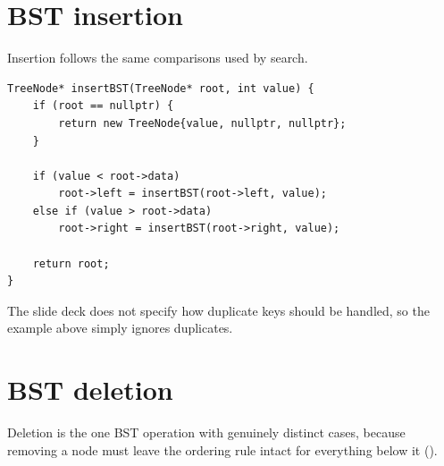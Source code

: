\section{BST insertion}

Insertion follows the same comparisons used by search.

\begin{lstlisting}
TreeNode* insertBST(TreeNode* root, int value) {
    if (root == nullptr) {
        return new TreeNode{value, nullptr, nullptr};
    }

    if (value < root->data)
        root->left = insertBST(root->left, value);
    else if (value > root->data)
        root->right = insertBST(root->right, value);

    return root;
}
\end{lstlisting}

The slide deck does not specify how duplicate keys should be handled, so the example above simply ignores duplicates.

\section{BST deletion}

Deletion is the one BST operation with genuinely distinct cases, because removing a node
must leave the ordering rule intact for everything below it ().

